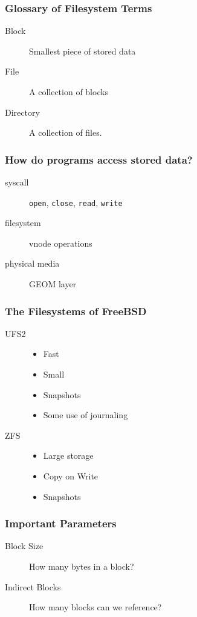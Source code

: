 \documentclass[pdftex]{beamer} %
\begin{document}
\begin{frame}
  \frametitle{Glossary of Filesystem Terms}
  \begin{description}
  \item[Block] Smallest piece of stored data
    \pause
  \item[File] A collection of blocks
    \pause
  \item [Directory] A collection of files.
  \end{description}
\end{frame}

\begin{frame}[fragile]
  \frametitle{How do programs access stored data?}
  \begin{description}
  \item[syscall] \verb|open|, \verb|close|, \verb|read|, \verb|write|
  \item[filesystem] vnode operations
    \item[physical media] GEOM layer
  \end{description}
\end{frame}

\begin{frame}
  \frametitle{The Filesystems of FreeBSD}
  \begin{description}
  \item [UFS2]
    \begin{itemize}
    \item Fast
    \item Small
    \item Snapshots
    \item Some use of journaling
    \end{itemize}
  \item [ZFS]
    \begin{itemize}
    \item Large storage
    \item Copy on Write
    \item Snapshots
    \end{itemize}
  \end{description}
\end{frame}

\begin{frame}
  \frametitle{Important Parameters}
  \begin{description}
  \item[Block Size] How many bytes in a block?
  \item [Indirect Blocks] How many blocks can we reference?
  \end{description}
\end{frame}
\end{document}
